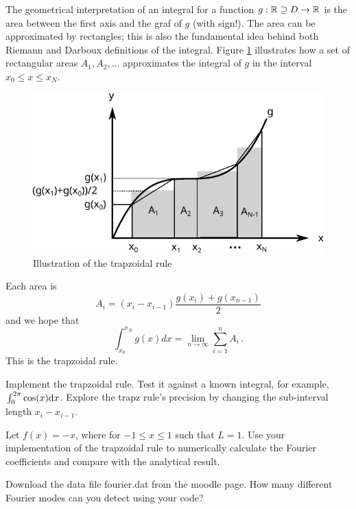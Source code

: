 The geometrical interpretation of an integral for a function
$g: \mathbb{R} \supseteq D \rightarrow \mathbb{R}$ is the area between the first axis
and the graf of $g$ (with sign!). The area can be approximated by
rectangles; this is also the fundamental idea behind both Riemann and
Darboux definitions of the integral. Figure \ref{fig:trapz}
illustrates how a set of rectangular areas $A_1, A_2, \ldots $
approximates the integral of $g$ in the interval
$x_0 \leq x \leq x_N$.
\begin{figure}[h]
  \includegraphics[scale=1.0]{figs/trapz.pdf}
  \caption{\label{fig:trapz}Illustration of the trapzoidal rule}
\end{figure}
Each area is 
\begin{equation}
  A_i = (x_i - x_{i-1}) \frac{g(x_i)+ g(x_{n-1})}{2}
\end{equation}
and we hope that
\begin{equation}
  \int_{x_0}^{x_N} g(x) d x = \lim_{n \rightarrow \infty} \sum_{i=1}
  ^n A_i \, .
\end{equation}
This is the trapzoidal rule.

\begin{exerciseregion}
\begin{exercise}
	Implement the trapzoidal rule. Test it against a known integral, for example, 
	$\int_0^{2\pi} \cos(x) \mathrm{d} x$. Explore the trapz rule's precision by changing 
	the sub-interval length $x_i - x_{i-1}$. 
\end{exercise}

\begin{exercise}
  Let $f(x) = -x$, where for $-1 \leq x \leq 1$ such that
  $L=1$. Use your implementation of the trapzoidal rule to
  numerically calculate the Fourier coefficients and compare with the
  analytical result. 
\end{exercise}

\begin{exercise}
  Download the data file \textsf{fourier.dat} from the moodle
  page. How many different Fourier modes can you detect using your code?
\end{exercise}
\end{exerciseregion}

%
